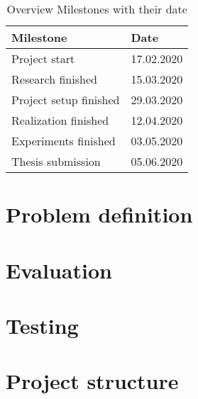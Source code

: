 \begin{table}[htbp]
    \centering
    \caption{Overview Milestones with their date}
	\label{tab:Milestones}
    \begin{tabular}{p{} | p{}}
        \toprule
        \textbf{Milestone} & \textbf{Date} \\ 
        \midrule[1pt]
        Project start & 17.02.2020\\
        \hline
        Research finished & 15.03.2020\\
        \hline
        Project setup finished & 29.03.2020\\
        \hline
        Realization finished & 12.04.2020\\
        \hline
        Experiments finished & 03.05.2020\\
        \hline
        Thesis submission & 05.06.2020\\
        \bottomrule
    \end{tabular}
\end{table}

\section{Problem definition}
\label{sec:Method-Problem-Definition}


\section{Evaluation}
\label{sec:Evaluation}

\section{Testing}
\label{sec:Testing}

\section{Project structure}
\label{sec:Project-Structure}

